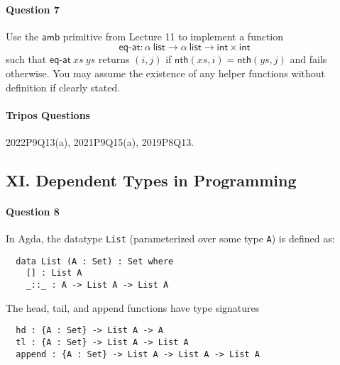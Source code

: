 \documentclass[11pt,a4paper,twoside]{article}
\begin{document}
\paragraph{Question 7} Use the $\mathsf{amb}$ primitive from Lecture 11 to implement a function
\[
  \mathsf{eq\text{-}at} : \alpha\ \mathsf{list} \to \alpha\ \mathsf{list} \to \mathsf{int} \times \mathsf{int}
\]
such that $\mathsf{eq\text{-}at}\ xs\ ys$ returns $(i,j)$ 
if $\mathsf{nth}(xs, i) = \mathsf{nth}(ys, j)$ and fails otherwise.
You may assume the existence of any helper functions without definition if clearly stated.


\paragraph{Tripos Questions} 2022P9Q13(a), 2021P9Q15(a), 2019P8Q13.

\subsection*{XI. Dependent Types in Programming}

\paragraph{Question 8} 
In Agda, the datatype \texttt{List} (parameterized over some type \texttt{A}) 
is defined as:
\begin{lstlisting}
  data List (A : Set) : Set where
    [] : List A
    _::_ : A -> List A -> List A
\end{lstlisting}
The head, tail, and append functions have type signatures
\begin{lstlisting}
  hd : {A : Set} -> List A -> A
  tl : {A : Set} -> List A -> List A
  append : {A : Set} -> List A -> List A -> List A
\end{lstlisting}

\vspace{-0.5em}
\end{document}
